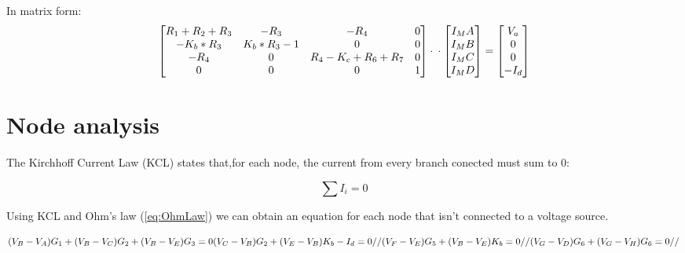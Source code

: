 In matrix form:
  \begin{equation}\label{eq:matrixeqn}
\begin{bmatrix}
R_1+R_2+R_3 & -R_3 & -R_4 & 0 \\

-K_b*R_3 & K_b* R_3-1 & 0 & 0 \\

-R_4 & 0 & R_4-K_c+R_6+R_7 & 0 \\

0 & 0 & 0 & 1 \\
\end{bmatrix}
\cdot

\\

\cdot
\begin{bmatrix}
I_MA \\
I_MB \\
I_MC \\
I_MD \\
    \end{bmatrix}
=
    \begin{bmatrix}
V_a \\
0 \\
0 \\
-I_d\\
    \end{bmatrix}
  \end{equation}



\section{Node analysis}
The Kirchhoff Current Law (KCL) states that,for each node, the current from every branch conected must sum to 0:

\begin{equation}
  \sum I_i = 0
  \label{eq:KCL}
\end{equation}


Using KCL and Ohm's law (\ref{eq:OhmLaw}) we can obtain an equation for each node that isn't connected to a voltage source.

\begin{equation}
    
  (V_B-V_A)G_1+(V_B-V_C)G_2+(V_B-V_E)G_3=0\\
  
  (V_C-V_B)G_2+(V_E-V_B)K_b-I_d=0//
  
  (V_F-V_E)G_5+(V_B-V_E)K_b=0//
  
  (V_G-V_D)G_6+(V_G-V_H)G_6=0//

  \label{eq:nodos}
\end{equation}


